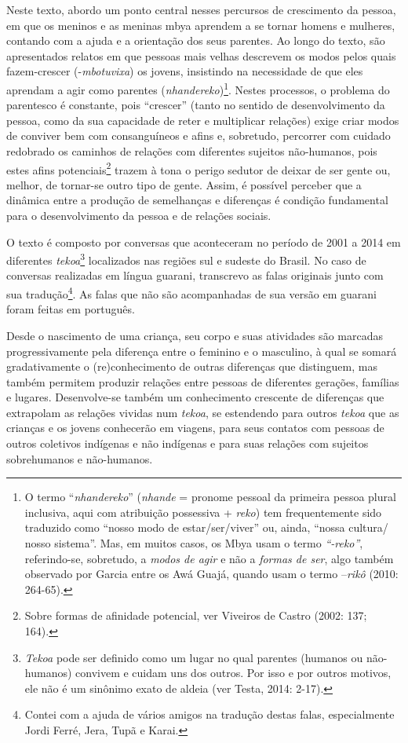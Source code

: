 Neste texto, abordo um ponto central nesses percursos de crescimento da
pessoa, em que os meninos e as meninas mbya aprendem a se tornar homens
e mulheres, contando com a ajuda e a orientação dos seus parentes. Ao
longo do texto, são apresentados relatos em que pessoas mais velhas
descrevem os modos pelos quais fazem-crescer (-\emph{mbotuvixa}) os
jovens, insistindo na necessidade de que eles aprendam a agir como
parentes (\emph{nhandereko})\footnote{O termo ``\emph{nhandereko}''
  (\emph{nhande} = pronome pessoal da primeira pessoa plural inclusiva,
  aqui com atribuição possessiva + \emph{reko}) tem frequentemente sido
  traduzido como ``nosso modo de estar/ser/viver'' ou, ainda, ``nossa
  cultura/ nosso sistema''. Mas, em muitos casos, os Mbya usam o termo
  \emph{``-reko''}, referindo-se, sobretudo, a \emph{modos de agir} e
  não a \emph{formas de ser}, algo também observado por Garcia entre os
  Awá Guajá, quando usam o termo --\emph{rikô} (2010: 264-65).}. Nestes
processos, o problema do parentesco é constante, pois ``crescer'' (tanto
no sentido de desenvolvimento da pessoa, como da sua capacidade de reter
e multiplicar relações) exige criar modos de conviver bem com
consanguíneos e afins e, sobretudo, percorrer com cuidado redobrado os
caminhos de relações com diferentes sujeitos não-humanos, pois estes
afins potenciais\footnote{Sobre formas de afinidade potencial, ver
  Viveiros de Castro (2002: 137; 164).} trazem à tona o perigo sedutor
de deixar de ser gente ou, melhor, de tornar-se outro tipo de gente.
Assim, é possível perceber que a dinâmica entre a produção de
semelhanças e diferenças é condição fundamental para o desenvolvimento
da pessoa e de relações sociais.

O texto é composto por conversas que aconteceram no período de 2001 a
2014 em diferentes \emph{tekoa}\footnote{\emph{Tekoa} pode ser definido
  como um lugar no qual parentes (humanos ou não-humanos) convivem e
  cuidam uns dos outros. Por isso e por outros motivos, ele não é um
  sinônimo exato de aldeia (ver Testa, 2014: 2-17).} localizados nas
regiões sul e sudeste do Brasil. No caso de conversas realizadas em
língua guarani, transcrevo as falas originais junto com sua
tradução\footnote{Contei com a ajuda de vários amigos na tradução destas
  falas, especialmente Jordi Ferré, Jera, Tupã e Karai.}. As falas que
não são acompanhadas de sua versão em guarani foram feitas em português.

Desde o nascimento de uma criança, seu corpo e suas atividades são
marcadas progressivamente pela diferença entre o feminino e o masculino,
à qual se somará gradativamente o (re)conhecimento de outras diferenças
que distinguem, mas também permitem produzir relações entre pessoas de
diferentes gerações, famílias e lugares. Desenvolve-se também um
conhecimento crescente de diferenças que extrapolam as relações vividas
num \emph{tekoa}, se estendendo para outros \emph{tekoa} que as crianças
e os jovens conhecerão em viagens, para seus contatos com pessoas de
outros coletivos indígenas e não indígenas e para suas relações com
sujeitos sobrehumanos e não-humanos.

